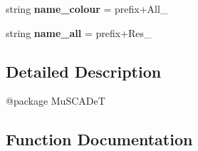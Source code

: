 \begin{DoxyCompactItemize}
\item 
\hypertarget{namespace_mu_s_c_a_de_t_1_1colour__subtraction_ab7371f16b40bc3a70dd2afcb91911539}{}string {\bfseries name\+\_\+colour} = prefix+\textquotesingle{}All\+\_\+\textquotesingle{}\label{namespace_mu_s_c_a_de_t_1_1colour__subtraction_ab7371f16b40bc3a70dd2afcb91911539}

\item 
\hypertarget{namespace_mu_s_c_a_de_t_1_1colour__subtraction_af78e153975a2942f598898a78ae5977d}{}string {\bfseries name\+\_\+all} = prefix+\textquotesingle{}Res\+\_\+\textquotesingle{}\label{namespace_mu_s_c_a_de_t_1_1colour__subtraction_af78e153975a2942f598898a78ae5977d}

\end{DoxyCompactItemize}


\subsection{Detailed Description}
\begin{DoxyVerb}@package MuSCADeT\end{DoxyVerb}
 

\subsection{Function Documentation}
\hypertarget{namespace_mu_s_c_a_de_t_1_1colour__subtraction_aaa57e5f31c93f38d46b0232a8b109451}{}
